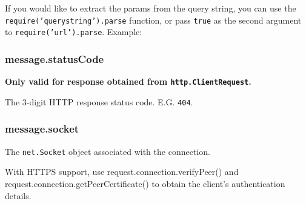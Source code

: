\begin{Shaded}
\begin{Highlighting}[]
\NormalTok{(}\NormalTok{)}
\NormalTok{\{ }\NormalTok{: }\NormalTok{,}
  \NormalTok{: }\NormalTok{,}
  \NormalTok{: }\NormalTok{,}
  \NormalTok{: } \NormalTok{\}}
\end{Highlighting}
\end{Shaded}

If you would like to extract the params from the query string, you can
use the \texttt{require('querystring').parse} function, or pass
\texttt{true} as the second argument to \texttt{require('url').parse}.
Example:

\begin{Shaded}
\begin{Highlighting}[]
\NormalTok{(}\NormalTok{, }\NormalTok{)}
\NormalTok{\{ }\NormalTok{: }\NormalTok{,}
  \NormalTok{: }\NormalTok{,}
  \NormalTok{: \{ }\NormalTok{: } \NormalTok{\},}
  \NormalTok{: } \NormalTok{\}}
\end{Highlighting}
\end{Shaded}

\subsubsection{message.statusCode}

\textbf{Only valid for response obtained from
\texttt{http.ClientRequest}.}

The 3-digit HTTP response status code. E.G. \texttt{404}.

\subsubsection{message.socket}

The \texttt{net.Socket} object associated with the connection.

With HTTPS support, use request.connection.verifyPeer() and
request.connection.getPeerCertificate() to obtain the client's
authentication details.
